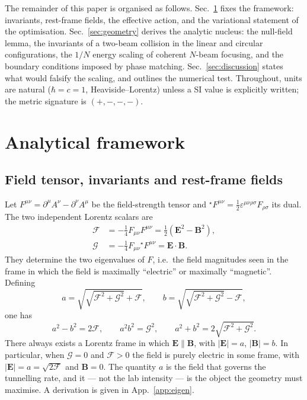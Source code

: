\documentclass[aps,prd,reprint,superscriptaddress,nofootinbib,floatfix]{revtex4-2}
\begin{document}
The remainder of this paper is organised as follows.
Sec.~\ref{sec:framework} fixes the framework: invariants, rest-frame fields,
the effective action, and the variational statement of the optimisation.
Sec.~\ref{sec:geometry} derives the analytic nucleus: the null-field lemma,
the invariants of a two-beam collision in the linear and circular
configurations, the $1/N$ energy scaling of coherent $N$-beam focusing, and
the boundary conditions imposed by phase matching. Sec.~\ref{sec:discussion}
states what would falsify the scaling, and outlines the numerical test.
Throughout, units are natural ($\hbar=c=1$, Heaviside--Lorentz) unless a
SI value is explicitly written; the metric signature is $(+,-,-,-)$.

\section{Analytical framework}
\label{sec:framework}

\subsection{Field tensor, invariants and rest-frame fields}

Let $F^{\mu\nu}=\partial^\mu A^\nu-\partial^\nu A^\mu$ be the field-strength
tensor and ${}^\star F^{\mu\nu}=\tfrac12\varepsilon^{\mu\nu\rho\sigma}
F_{\rho\sigma}$ its dual. The two independent Lorentz scalars are
\begin{equation}
\begin{aligned}
\mathcal{F}&=-\tfrac14 F_{\mu\nu}F^{\mu\nu}
=\tfrac12\!\left(\mathbf{E}^2-\mathbf{B}^2\right),\\
\mathcal{G}&=-\tfrac14 F_{\mu\nu}{}^\star F^{\mu\nu}=\mathbf{E}\cdot\mathbf{B}.
\end{aligned}
\label{eq:invariants2}
\end{equation}
They determine the two eigenvalues of $F$, i.e.\ the field magnitudes seen in
the frame in which the field is maximally ``electric'' or maximally
``magnetic''. Defining
\begin{equation}
a=\sqrt{\sqrt{\mathcal{F}^2+\mathcal{G}^2}+\mathcal{F}},
\qquad
b=\sqrt{\sqrt{\mathcal{F}^2+\mathcal{G}^2}-\mathcal{F}},
\label{eq:ab}
\end{equation}
one has
\begin{equation}
a^2-b^2=2\mathcal{F},\qquad a^2b^2=\mathcal{G}^2,\qquad
a^2+b^2=2\sqrt{\mathcal{F}^2+\mathcal{G}^2}.
\label{eq:abrel}
\end{equation}
There always exists a Lorentz frame in which $\mathbf{E}\parallel\mathbf{B}$,
with $|\mathbf{E}|=a$, $|\mathbf{B}|=b$. In particular, when
$\mathcal{G}=0$ and $\mathcal{F}>0$ the field is purely electric in some frame,
with $|\mathbf{E}|=a=\sqrt{2\mathcal{F}}$ and $\mathbf{B}=0$. The quantity
$a$ is the field that governs the tunnelling rate, and it --- not the lab
intensity --- is the object the geometry must maximise.
A derivation is given in App.~\ref{app:eigen}.
\end{document}
